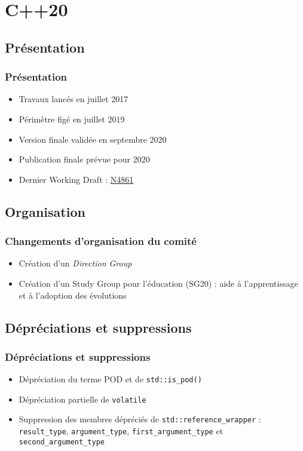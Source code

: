 \documentclass[C++.tex]{subfiles}
\begin{document}
\section{C++20}
\subsection*{Présentation}
\begin{frame}
	\frametitle{Présentation}
	\begin{itemize}
		\item Travaux lancés en juillet 2017
		\item Périmètre figé en juillet 2019
		\item Version finale validée en septembre 2020
		\item Publication finale prévue pour 2020
		\item Dernier Working Draft : \href{https://github.com/cplusplus/draft/releases/download/n4861/n4861.pdf}{N4861}
	\end{itemize}
\end{frame}

\subsection*{Organisation}
\begin{frame}
	\frametitle{Changements d'organisation du comité}
	\begin{itemize}
		\item Création d'un \textit{Direction Group}
		\item Création d'un Study Group pour l'éducation (SG20) : aide à l'apprentissage et à l'adoption des évolutions
	\end{itemize}

	\centering

\end{frame}

\subsection*{Dépréciations et suppressions}
\begin{frame}[fragile]
	\frametitle{Dépréciations et suppressions}
	\begin{itemize}
		\item Dépréciation du terme POD et de \lstinline|std::is_pod()|
		\item Dépréciation partielle de \lstinline|volatile|


		\item Suppression des membres dépréciés de \lstinline|std::reference_wrapper| : \lstinline|result_type|, \lstinline|argument_type|, \lstinline|first_argument_type| et \lstinline|second_argument_type|
	\end{itemize}
\end{frame}
\end{document}

